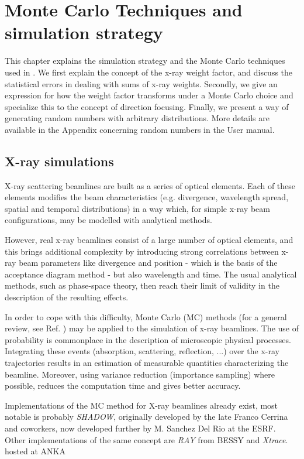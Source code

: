 \chapter{Monte Carlo Techniques and simulation strategy}
\label{c:MCtechniques}

This chapter explains the simulation strategy and the Monte Carlo
techniques used in \MCX. We first explain the concept of the x-ray
weight factor, and discuss the statistical errors in dealing with sums
of x-ray weights.  Secondly, we give an expression for how the weight
factor transforms under a Monte Carlo choice and specialize this
to the concept of direction focusing.  Finally, we present a way of
generating random numbers with arbitrary distributions.
More details are available in the Appendix concerning random numbers in the User manual.


\section{X-ray simulations}
X-ray scattering beamlines are built as a series of optical elements.
Each of these elements modifies the beam characteristics (e.g. divergence,
wavelength spread, spatial and temporal distributions) in a way which, for simple
x-ray beam configurations, may be modelled with analytical methods. 

However, real x-ray beamlines consist of a large number of optical
elements, and this brings additional complexity by introducing strong
correlations between x-ray beam parameters like divergence and position - which
is the basis of the acceptance diagram method - but also wavelength and time.
The usual analytical methods, such as phase-space theory, then reach their
limit of validity in the description of the resulting effects.

In order to cope with this difficulty, Monte Carlo (MC) methods (for a general review, see Ref. \cite{James80}) may be
applied to the simulation of x-ray beamlines. The use of probability is commonplace in the description of microscopic
physical processes. Integrating these events (absorption, scattering, reflection, ...) over the x-ray trajectories
results in an estimation of measurable quantities characterizing the beamline. Moreover, using variance reduction
(importance sampling) where possible, reduces the computation time and gives better accuracy.

Implementations of the MC method for X-ray beamlines already exist, most
notable is probably \textit{SHADOW}\cite{welnak1994shadow}, originally developed by the late Franco
Cerrina and coworkers, now developed further by M. Sanchez Del Rio at the ESRF\cite{sanchez2011shadow3}\cite{shadow_website}.
Other implementations of the same concept are \textit{RAY}\cite{schaefers2008bessy} from BESSY and \textit{Xtrace}\cite{bauer2007simulation}.
hosted at ANKA

